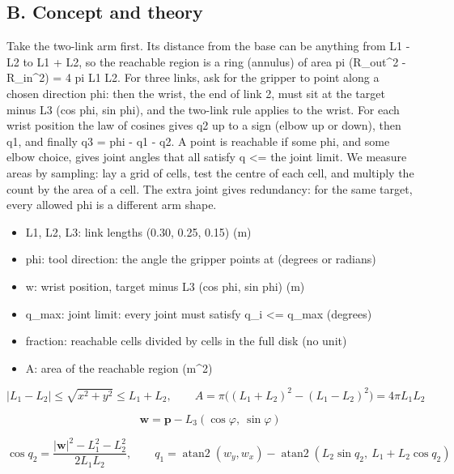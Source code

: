 \documentclass[11pt,a4paper]{article}
\begin{document}
\subsection*{B. Concept and theory}
Take the two-link arm first. Its distance from the base can be anything from \textbar{}L1 - L2\textbar{} to L1 + L2, so the reachable region is a ring (annulus) of area pi (R\_out\textasciicircum{}2 - R\_in\textasciicircum{}2) = 4 pi L1 L2. For three links, ask for the gripper to point along a chosen direction phi: then the wrist, the end of link 2, must sit at the target minus L3 (cos phi, sin phi), and the two-link rule applies to the wrist. For each wrist position the law of cosines gives q2 up to a sign (elbow up or down), then q1, and finally q3 = phi - q1 - q2. A point is reachable if some phi, and some elbow choice, gives joint angles that all satisfy \textbar{}q\textbar{} \textless{}= the joint limit. We measure areas by sampling: lay a grid of cells, test the centre of each cell, and multiply the count by the area of a cell. The extra joint gives redundancy: for the same target, every allowed phi is a different arm shape.

\begin{itemize}[nosep]
\item L1, L2, L3: link lengths (0.30, 0.25, 0.15) (m)
\item phi: tool direction: the angle the gripper points at (degrees or radians)
\item w: wrist position, target minus L3 (cos phi, sin phi) (m)
\item q\_max: joint limit: every joint must satisfy \textbar{}q\_i\textbar{} \textless{}= q\_max (degrees)
\item fraction: reachable cells divided by cells in the full disk (no unit)
\item A: area of the reachable region (m\textasciicircum{}2)
\end{itemize}

\begin{equation*}
|L_1-L_2|\le\sqrt{x^2+y^2}\le L_1+L_2,\qquad A=\pi\big((L_1+L_2)^2-(L_1-L_2)^2\big)=4\pi L_1L_2
\end{equation*}

\begin{equation*}
\mathbf w=\mathbf p-L_3(\cos\varphi,\ \sin\varphi)
\end{equation*}

\begin{equation*}
\cos q_2=\frac{|\mathbf w|^2-L_1^2-L_2^2}{2L_1L_2},\qquad q_1=\operatorname{atan2}(w_y,w_x)-\operatorname{atan2}(L_2\sin q_2,\ L_1+L_2\cos q_2)
\end{equation*}
\end{document}
